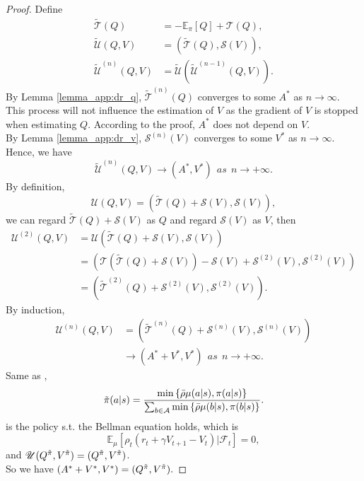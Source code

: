 \begin{proof}
 Define
 $$
 \begin{aligned}
        \widetilde{\mathscr{T}}(Q) &= - \mathbb{E}_\pi[Q] + \mathscr{T}(Q), \\
        \widetilde{\mathscr{U}}(Q, V) &= (\widetilde{\mathscr{T}}(Q), \mathscr{S}(V)), \\
        \widetilde{\mathscr{U}}^{(n)}(Q, V) &=   \widetilde{\mathscr{U}}(\widetilde{\mathscr{U}}^{(n-1)}(Q, V)).
 \end{aligned}
 $$
By Lemma \ref{lemma_app:dr_q}, $\widetilde{\mathscr{T}}^{(n)}(Q)$ converges to some $A^*$ as $n \rightarrow \infty$. This process will not influence the estimation of $V$ as the gradient of $V$ is stopped when estimating $Q$. According to the proof, $A^*$ does not depend on $V$. \\
By Lemma \ref{lemma_app:dr_v}, $\mathscr{S}^{(n)}(V)$ converges to some $V^*$ as $n \rightarrow \infty$. \\
Hence, we have
$$
\widetilde{\mathscr{U}}^{(n)}(Q, V) \rightarrow (A^*, V^*)\ \ as\ \ n \rightarrow +\infty. 
$$
By definition, 
$$
\mathscr{U}(Q, V) = (\widetilde{\mathscr{T}}(Q) + \mathscr{S}(V), \mathscr{S}(V)),
$$
we can regard $\widetilde{\mathscr{T}}(Q) + \mathscr{S}(V)$ as $Q$ and regard $\mathscr{S}(V)$ as $V$, then
$$
\begin{aligned}
    \mathscr{U}^{(2)}(Q, V) 
    &= \mathscr{U}(\widetilde{\mathscr{T}}(Q) + \mathscr{S}(V), \mathscr{S}(V)) \\
    &= (\mathscr{T}(\widetilde{\mathscr{T}}(Q) + \mathscr{S}(V)) -\mathscr{S}(V) + \mathscr{S}^{(2)}(V), \mathscr{S}^{(2)}(V)) \\
    &= (\widetilde{\mathscr{T}}^{(2)}(Q) + \mathscr{S}^{(2)}(V), \mathscr{S}^{(2)}(V)).
\end{aligned}
$$
By induction, 
$$
\begin{aligned}
    \mathscr{U}^{(n)}(Q, V) &= (\widetilde{\mathscr{T}}^{(n)}(Q) + \mathscr{S}^{(n)}(V), \mathscr{S}^{(n)}(V)) \\
    &\rightarrow (A^*+V^*, V^*)\ \ as\ \ n\rightarrow + \infty.
\end{aligned}
$$
Same as \citep{impala}, 
$$
    \Tilde{\pi}(a|s) = \frac
    {\min \left\{\Bar{\rho} \mu (a|s), \pi(a|s)\right\}}
    {\sum_{b \in \mathcal{A}}\min \left\{\Bar{\rho} \mu (b|s), \pi(b|s)\right\}}.
$$ 
is the policy s.t. the Bellman equation holds, which is 
$$\mathbb{E}_\mu[\rho_t (r_t + \gamma V_{t+1} - V_t) | \mathscr{F}_t] = 0,$$ and $\mathscr{U}(Q^{\Tilde{\pi}}, V^{\Tilde{\pi}}) = (Q^{\Tilde{\pi}}, V^{\Tilde{\pi}})$. \\
So we have
$(A^*+V^*, V^*) = (Q^{\Tilde{\pi}}, V^{\Tilde{\pi}}).$
\end{proof}

